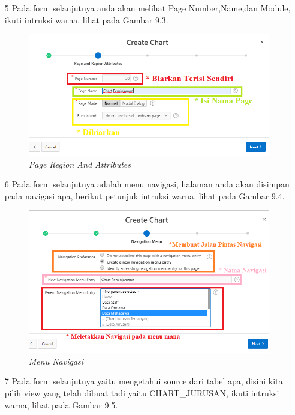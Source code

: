 \begin{itemize}
    \item[5]Pada form selanjutnya anda akan melihat Page Number,Name,dan Module, ikuti intruksi warna, lihat pada Gambar 9.3.
    \begin{figure}
        \centering
        \includegraphics[scale=0.5]{figures/chart/chart3.png}
        \caption{\textit{Page Region And Attributes}}
        \label{Page Region And Attributes}
    \end{figure}
    \item[6]Pada form selanjutnya adalah menu navigasi, halaman anda akan disimpan pada navigasi apa, berikut petunjuk intruksi warna, lihat pada Gambar 9.4.
    \begin{figure}
        \centering
        \includegraphics[scale=0.5]{figures/chart/chart4.png}
        \caption{\textit{Menu Navigasi}}
        \label{Menu Navigasi}
    \end{figure}
    \item[7]Pada form selanjutnya yaitu mengetahui source dari tabel apa, disini kita pilih view yang telah dibuat tadi yaitu CHART\_JURUSAN, ikuti intruksi warna, lihat pada Gambar 9.5.
    \begin{figure}

\end{figure}
\end{itemize}
